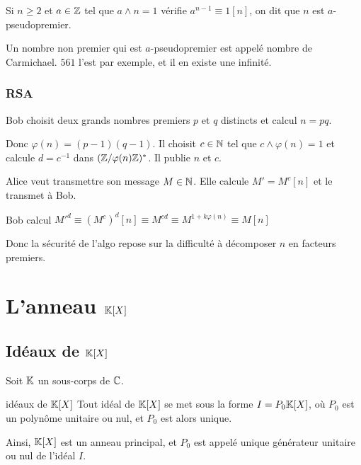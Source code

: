 Si $n \geqslant 2$ et $a \in \mathbb{Z}$ tel que $a \wedge n = 1$ vérifie $a^{n -1} \equiv 1 [n]$,
on dit que $n$ est $a$-pseudopremier.

Un nombre non premier qui est $a$-pseudopremier est appelé nombre de Carmichael. 
$561$ l'est par exemple, et il en existe une infinité. 

\subsubsection{RSA }

Bob choisit deux grands nombres premiers $p$ et $q$ distincts et calcul $n = pq$. 

Donc $\varphi(n) = (p- 1)(q-1)$. Il choisit $c \in \mathbb{N}$ tel que $c \wedge \varphi(n) = 1$ et 
calcule $d = c^{-1}$ dans $(\mathbb{Z}/\varphi(n)\mathbb{Z})^*$. Il publie $n$ et $c$. 

Alice veut transmettre son message $M \in \mathbb{N}$. Elle calcule $M' = M^c [n]$ et le transmet à Bob.

Bob calcul $M'^d \equiv (M^c)^d [n] \equiv M^{cd} \equiv M^{1 + k \varphi(n)} \equiv M[n]$

Donc la sécurité de l'algo repose sur la difficulté à décomposer $n$ en facteurs premiers. 


\section{L'anneau \texorpdfstring{$\mathbb{K} [X]$}{K[X]}}
\subsection{Idéaux de \texorpdfstring{$\mathbb{K} [X]$}{K[X]}}

Soit $\mathbb{K}$ un sous-corps de $\mathbb{C}$.

\begin{theoreme}{idéaux de $\mathbb{K}[X]$}{}
    Tout idéal de $\mathbb{K}[X]$ se met sous la forme $I = P_0 \mathbb{K}[X]$, où $P_0$ est un polynôme
    unitaire ou nul, et $P_0$ est alors unique.

    Ainsi, $\mathbb{K}[X]$ est un anneau principal, et $P_0$ est appelé unique générateur unitaire 
    ou nul de l'idéal $I$.
\end{theoreme}


